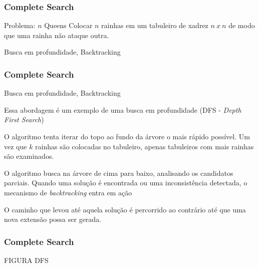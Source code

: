 \begin{frame}
\frametitle{Complete Search}
\begin{block}{Problema: $n$ Queens}
\scriptsize
Colocar $n$ rainhas em um tabuleiro de xadrez $n\ x\ n$ de modo que uma rainha não ataque outra.
\end{block}

\begin{block}{Busca em profundidade, Backtracking}
\end{block}
\end{frame}

\begin{frame}
\frametitle{Complete Search}

\begin{block}{Busca em profundidade, Backtracking}

\begin{itemize}
	\bitem Essa abordagem é um exemplo de uma busca em profundidade (DFS - \emph{Depth First Search})
	\begin{itemize}
		\bitem O algoritmo tenta iterar do topo ao fundo da árvore o mais rápido possível.
		\bitem Um vez que $k$ rainhas são colocadas no tabuleiro, apenas tabuleiros com mais rainhas são examinados.
	\end{itemize}
	\bitem O algoritmo busca na árvore de cima para baixo, analisando os candidatos parciais.
	\bitem Quando uma solução é encontrada ou uma inconsistência detectada, o mecanismo de \emph{backtracking} entra em ação
	\begin{itemize}
		\bitem O caminho que levou até aquela solução é percorrido ao contrário até que uma nova extensão possa ser gerada.
	\end{itemize}
\end{itemize}
\end{block}
\end{frame}

\begin{frame}
\frametitle{Complete Search}
\huge FIGURA DFS
\end{frame}

